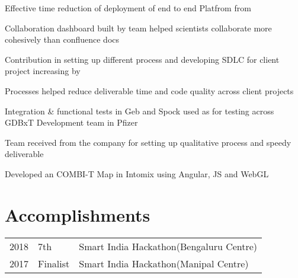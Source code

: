 \documentclass[]{single-page-resume}
\begin{document}
\begin{minipage}[t]{0.66\textwidth}
\begin{tightemize}
\item Effective time reduction of deployment of end to end Platfrom from 
\item Collaboration dashboard built by team helped scientists collaborate more cohesively than confluence docs
\item Contribution in  setting up different process and developing SDLC for client project increasing  by 
\item Processes helped reduce deliverable time and code quality across client projects
\item Integration \& functional tests in Geb and Spock used as  for testing across GDBxT Development team in Pfizer
\item Team received  from the company for setting up qualitative
process and speedy deliverable

\end{tightemize}

\vspace{\topsep} %
\begin{tightemize}
    \item Developed an COMBI-T Map in Intomix using Angular, JS and WebGL \end{tightemize}
\sectionsep


\section{Accomplishments} 
\begin{tabular}{rll}
2018	    &7th  & Smart India Hackathon(Bengaluru Centre)\\
2017	     & Finalist & Smart India Hackathon(Manipal Centre)
\end{tabular}
\sectionsep

\end{minipage} 
\end{document}

